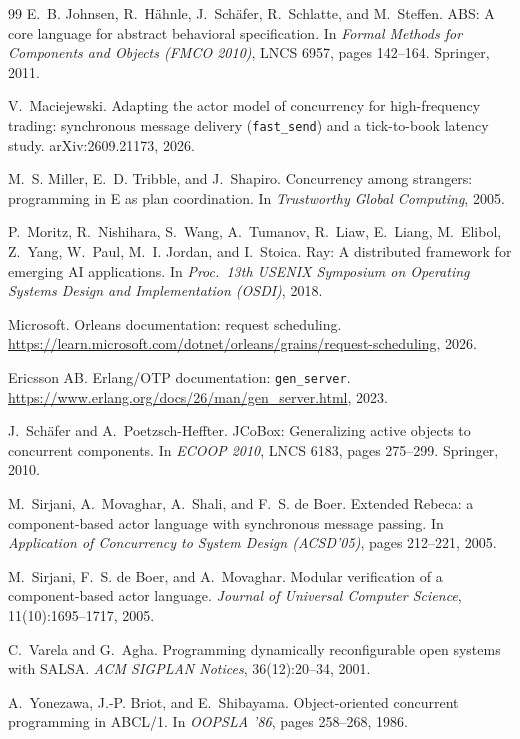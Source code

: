 \documentclass[11pt]{article}
\theoremstyle{definition}
\theoremstyle{remark}
\begin{document}
\begin{thebibliography}{99}
 E.~B. Johnsen, R.~H\"ahnle, J.~Sch\"afer, R.~Schlatte, and
  M.~Steffen. ABS: A core language for abstract behavioral specification. In \emph{Formal
  Methods for Components and Objects (FMCO 2010)}, LNCS 6957, pages 142--164. Springer, 2011.

 V.~Maciejewski. Adapting the actor model of concurrency for
  high-frequency trading: synchronous message delivery (\texttt{fast\_send}) and a
  tick-to-book latency study. arXiv:2609.21173, 2026.

 M.~S. Miller, E.~D. Tribble, and J.~Shapiro. Concurrency among
  strangers: programming in E as plan coordination. In \emph{Trustworthy Global
  Computing}, 2005.

 P.~Moritz, R.~Nishihara, S.~Wang, A.~Tumanov, R.~Liaw, E.~Liang,
M.~Elibol, Z.~Yang, W.~Paul, M.~I. Jordan, and I.~Stoica. Ray: A distributed framework for
emerging AI applications. In \emph{Proc.\ 13th USENIX Symposium on Operating Systems
Design and Implementation (OSDI)}, 2018.

 Microsoft. Orleans documentation: request scheduling.
\url{https://learn.microsoft.com/dotnet/orleans/grains/request-scheduling}, 2026.

 Ericsson AB. Erlang/OTP documentation: \texttt{gen\_server}.
\url{https://www.erlang.org/docs/26/man/gen_server.html}, 2023.

 J.~Sch\"afer and A.~Poetzsch-Heffter. JCoBox: Generalizing
active objects to concurrent components. In \emph{ECOOP 2010}, LNCS 6183, pages
275--299. Springer, 2010.

 M.~Sirjani, A.~Movaghar, A.~Shali, and F.~S. de Boer.
  Extended Rebeca: a component-based actor language with synchronous message passing. In
  \emph{Application of Concurrency to System Design (ACSD'05)}, pages 212--221, 2005.

 M.~Sirjani, F.~S. de Boer, and A.~Movaghar. Modular verification
  of a component-based actor language. \emph{Journal of Universal Computer Science},
  11(10):1695--1717, 2005.

 C.~Varela and G.~Agha. Programming dynamically reconfigurable
open systems with SALSA. \emph{ACM SIGPLAN Notices}, 36(12):20--34, 2001.

 A.~Yonezawa, J.-P. Briot, and E.~Shibayama. Object-oriented
  concurrent programming in ABCL/1. In \emph{OOPSLA '86}, pages 258--268, 1986.
\end{thebibliography}
\end{document}
